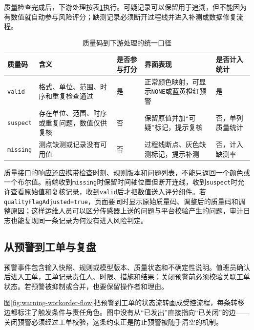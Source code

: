质量检查完成后，下游处理按表\ref{tab:quality-code-downstream}执行。可疑记录可以保留用于追溯，但不能因为有数值就自动参与风险评分；缺测记录必须断开过程线并进入补测或数据修复流程。

\begin{table}[htbp]
\centering
\caption{质量码到下游处理的统一口径}
\label{tab:quality-code-downstream}
\begin{tabular}{p{1.7cm}p{3.3cm}p{2.2cm}p{4.0cm}p{2.1cm}}
\toprule
质量码 & 含义 & 是否参与打分 & 界面表现 & 是否计入统计 \\
\midrule
\texttt{valid} & 格式、单位、范围、时序和重复检查通过 & 是 & 正常颜色映射，可显示\texttt{NONE}或蓝黄橙红预警 & 是 \\
\texttt{suspect} & 存在单位、范围、时序或重复问题，数值仅供复核 & 否 & 保留原值并加“可疑”标记，提示复核 & 否，单列质量统计 \\
\texttt{missing} & 测点缺测或记录没有可用值 & 否 & 过程线断点、灰色缺测标记，提示补测 & 否，计入缺测率 \\
\bottomrule
\end{tabular}
\end{table}

质量接口的响应还应携带检查时刻、规则版本和问题列表，不能只返回一个颜色或一个布尔值。前端收到\texttt{missing}时保留时间轴位置但断开连线，收到\texttt{suspect}时允许查看原始值和复核记录，收到\texttt{valid}后才把数值送入评分组件。若\texttt{qualityFlagAdjusted=true}，页面要同时显示原始质量码、调整后的质量码和调整原因；这样运维人员可以区分传感器上送的问题与平台校验产生的问题，审计日志也能复现同一条记录为何没有进入风险判定。

\subsection{从预警到工单与复盘}

预警事件包含输入快照、规则或模型版本、质量状态和不确定性说明。值班员确认后进入工单，工单记录责任人、时限、措施和结果；关闭预警前必须校验关联工单状态。若预警被抑制或合并，也要保留操作者和理由。

图\ref{fig:warning-workorder-flow}把预警到工单的状态流转画成受控流程，每条转移边都标注了触发条件与责任角色。图中没有从“已发出”直接指向“已关闭”的边——关闭预警必须经过工单校验，这条约束正是防止预警被随手清空的机制。

